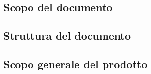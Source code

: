\subsection{Scopo del documento}
\subsection{Struttura del documento}
\subsection{Scopo generale del prodotto}